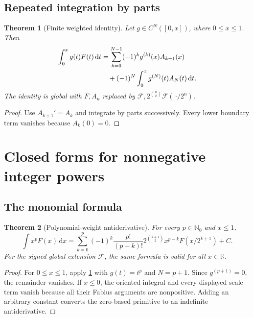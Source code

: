 \documentclass[11pt,oneside]{article}
\newtheorem{theorem}{Theorem}[section]
\theoremstyle{definition}
\theoremstyle{remark}
\newcommand{\R}{\mathbb R}
\newcommand{\N}{\mathbb N}
\newcommand{\dd}{\,\mathrm d}
\newcommand{\1}{\mathbf 1}
\begin{document}
\subsection{Repeated integration by parts}
\begin{theorem}[Finite weighted identity]
\label{p2:thm:finite-weighted}
Let $g\in C^N([0,x])$, where $0\le x\le1$.  Then
\begin{align}
 \int_0^xg(t)F(t)\dd t
 &=\sum_{k=0}^{N-1}(-1)^kg^{(k)}(x)A_{k+1}(x)              \notag\\
 &\quad+(-1)^N\int_0^xg^{(N)}(t)A_N(t)\dd t.              \label{p2:eq:finite-weighted}
\end{align}
The identity is global with $F,A_n$ replaced by $\mathcal F,
2^{\binom n2}\mathcal F(\,\boldsymbol{\cdot}/2^n)$.
\end{theorem}

\begin{proof}
Use $A_{k+1}'=A_k$ and integrate by parts successively.  Every lower boundary
term vanishes because $A_k(0)=0$.
\end{proof}

\section{Closed forms for nonnegative integer powers}
\label{p2:sec:polynomial}

\subsection{The monomial formula}
\begin{theorem}[Polynomial-weight antiderivative]
\label{p2:thm:monomial}
For every $p\in\N_0$ and $x\le1$,
\begin{equation}
 \boxed{
 \int x^pF(x)\dd x=
 \sum_{k=0}^{p}(-1)^k\frac{p!}{(p-k)!}
 2^{\binom{k+1}{2}}x^{p-k}F(x/2^{k+1})+C.}                \label{p2:eq:monomial-closed}
\end{equation}
For the signed global extension $\mathcal F$, the same formula is valid for all
$x\in\R$.
\end{theorem}

\begin{proof}
For $0\le x\le1$, apply \cref{p2:thm:finite-weighted} with $g(t)=t^p$ and
$N=p+1$.  Since $g^{(p+1)}=0$, the remainder vanishes.  If $x\le0$, the
oriented integral and every displayed scale term vanish because all their
Fabius arguments are nonpositive.  Adding an arbitrary constant converts the
zero-based primitive to an indefinite antiderivative.
\end{proof}
\end{document}
